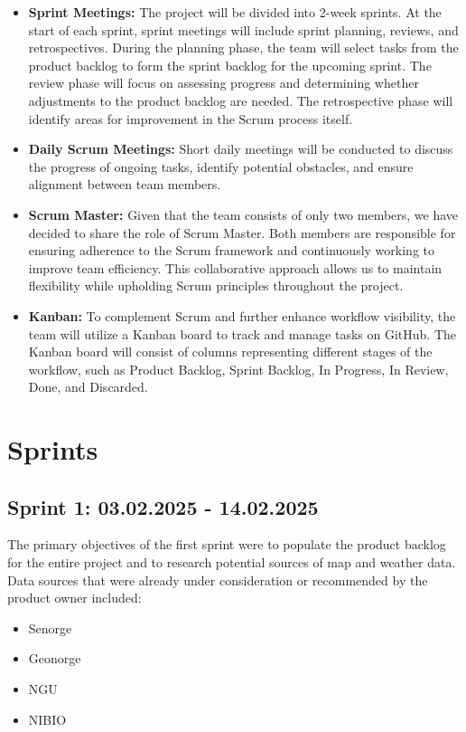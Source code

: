 \begin{itemize}
    \item \textbf{Sprint Meetings:} The project will be divided into 2-week sprints. At the start of each sprint, sprint meetings will include sprint planning, reviews, and retrospectives. During the planning phase, the team will select tasks from the product backlog to form the sprint backlog for the upcoming sprint. The review phase will focus on assessing progress and determining whether adjustments to the product backlog are needed. The retrospective phase will identify areas for improvement in the Scrum process itself.
    \item \textbf{Daily Scrum Meetings:} Short daily meetings will be conducted to discuss the progress of ongoing tasks, identify potential obstacles, and ensure alignment between team members.
    \item \textbf{Scrum Master:} Given that the team consists of only two members, we have decided to share the role of Scrum Master. Both members are responsible for ensuring adherence to the Scrum framework and continuously working to improve team efficiency. This collaborative approach allows us to maintain flexibility while upholding Scrum principles throughout the project.
    \item \textbf{Kanban:} To complement Scrum and further enhance workflow visibility, the team will utilize a Kanban board to track and manage tasks on GitHub. The Kanban board will consist of columns representing different stages of the workflow, such as Product Backlog, Sprint Backlog, In Progress, In Review, Done, and Discarded.
\end{itemize}

\section{Sprints}
\subsection{Sprint 1: 03.02.2025 - 14.02.2025}

The primary objectives of the first sprint were to populate the product backlog for the entire project and to research potential sources of map and weather data. Data sources that were already under consideration or recommended by the product owner included:
\begin{itemize} 
    \item Senorge
    \item Geonorge
    \item NGU
    \item NIBIO
\end{itemize}

